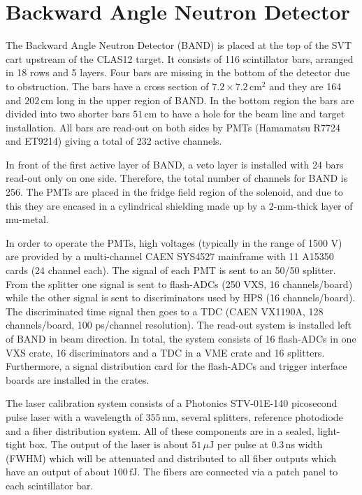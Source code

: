 \section{Backward Angle Neutron Detector}
The Backward Angle Neutron Detector (BAND) is placed at the top of the SVT cart upstream of the CLAS12 target. It consists of 116 scintillator bars, arranged in 18 rows and 5 layers. Four bars are missing in the bottom of the detector due to obstruction. The bars have a cross section of $7.2 \times 7.2\,\mathrm{cm}^{2}$ and they are 164 and $202\,\mathrm{cm}$ long in the upper region of BAND. In the bottom region the bars are divided into two shorter bars $51\,\mathrm{cm}$ to have a hole for the beam line and target installation. All bars are read-out on both sides by PMTs (Hamamatsu R7724 and ET9214) giving a total of 232 active channels. 

In front of the first active layer of BAND, a veto layer is installed with 24 bars read-out only on one side. Therefore, the total number of channels for BAND is 256.
The PMTs are placed in the fridge field region of the solenoid, and due to this they are encased in a cylindrical shielding made up by a 2-mm-thick layer of mu-metal.

In order to operate the PMTs, high voltages (typically in the range of 1500 V) are provided by a multi-channel CAEN SYS4527 mainframe with 11 A15350 cards (24 channel each).
The signal of each PMT is sent to an 50/50 splitter.
From the splitter one signal is sent to flash-ADCs (250 VXS, 16 channels/board) while the other signal is sent to discriminators used by HPS (16 channels/board).
The discriminated time signal then goes to a TDC (CAEN VX1190A, 128 channels/board, 100 ps/channel resolution). The read-out system is installed left of BAND in beam direction. 
In total, the system consists of 16 flash-ADCs in one VXS crate, 16 discriminators and a TDC in a VME crate and 16 splitters.  Furthermore, a signal distribution card for the flash-ADCs and trigger interface boards are installed in the crates.

The laser calibration system consists of a Photonics STV-01E-140 picosecond pulse laser with a wavelength of $355\,\mathrm{nm}$, several splitters, reference photodiode and a fiber distribution system. All of these components are in a sealed, light-tight box. The output of the laser is about $51\,\mu\mathrm{J}$ per pulse at $0.3\,$ns width (FWHM) which will be attenuated and distributed to all fiber outputs which have an output of about $100\,\mathrm{fJ}$. The fibers are connected via a patch panel to each scintillator bar.

